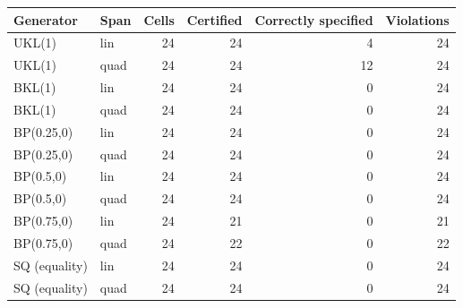\begin{tabular}{llrrrr}
\hline
Generator & Span & Cells & Certified & Correctly specified & Violations \\
\hline
UKL(1) & lin & 24 & 24 & 4 & 24 \\
UKL(1) & quad & 24 & 24 & 12 & 24 \\
BKL(1) & lin & 24 & 24 & 0 & 24 \\
BKL(1) & quad & 24 & 24 & 0 & 24 \\
BP(0.25,0) & lin & 24 & 24 & 0 & 24 \\
BP(0.25,0) & quad & 24 & 24 & 0 & 24 \\
BP(0.5,0) & lin & 24 & 24 & 0 & 24 \\
BP(0.5,0) & quad & 24 & 24 & 0 & 24 \\
BP(0.75,0) & lin & 24 & 21 & 0 & 21 \\
BP(0.75,0) & quad & 24 & 22 & 0 & 22 \\
\hline
SQ (equality) & lin & 24 & 24 & 0 & 24 \\
SQ (equality) & quad & 24 & 24 & 0 & 24 \\
\hline
\end{tabular}
